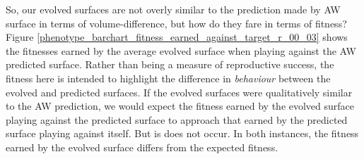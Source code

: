 \documentclass[11pt]{book}
\newcommand*{\np}{\par\noindent\newline}
\begin{document}
\np So, our evolved surfaces are not overly similar to the prediction made by AW surface in terms of volume-difference, but how do they fare in terms of fitness?
Figure \ref{phenotype_barchart_fitness_earned_against_target_r_00_03} shows the fitnesses earned by the average evolved surface when playing against the AW predicted surface.
Rather than being a measure of reproductive success, the fitness here is intended to highlight the difference in \textit{behaviour} between the evolved and predicted surfaces.
If the evolved surfaces were qualitatively similar to the AW prediction, we would expect the fitness earned by the evolved surface playing against the predicted surface to approach that earned by the predicted surface playing against itself.
But is does not occur.
In both instances, the fitness earned by the evolved surface differs from the expected fitness.
\end{document}

